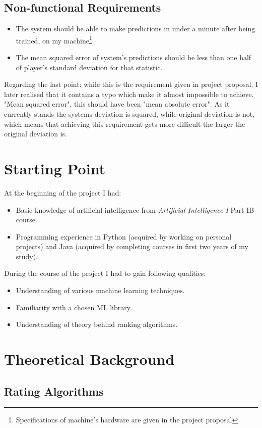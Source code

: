 \documentclass[12pt,a4paper]{book}
\begin{document}
\subsection{Non-functional Requirements}
\begin{itemize}
\item The system should be able to make predictions in under a minute after being trained, on my machine\footnote{Specifications of machine's hardware are given in the project proposal}.
\item The mean squared error of system's predictions should be less than one half of player's standard deviation for that statistic.
\end{itemize}
Regarding the last point: while this is the requirement given in project proposal, I later realised that it contains a typo which make it almost impossible to achieve.
"Mean squared error", this should have been "mean absolute error".
As it currently stands the systems deviation is squared, while original deviation is not, which means that achieving this requirement gets more difficult the larger the original deviation is.
\section{Starting Point}
\noindent
At the beginning of the project I had:
\begin{itemize}
\item Basic knowledge of artificial intelligence from \emph{Artificial Intelligence I} Part IB course.
\item Programming experience in Python (acquired by working on personal projects) and Java (acquired by completing courses in first two years of my study).
\end{itemize}
During the course of the project I had to gain following qualities:
\begin{itemize}
\item Understanding of various machine learning techniques.
\item Familiarity with a chosen ML library.
\item Understanding of theory behind ranking algorithms.
\end{itemize}
\section{Theoretical Background}
\subsection{Rating Algorithms}
\end{document}
